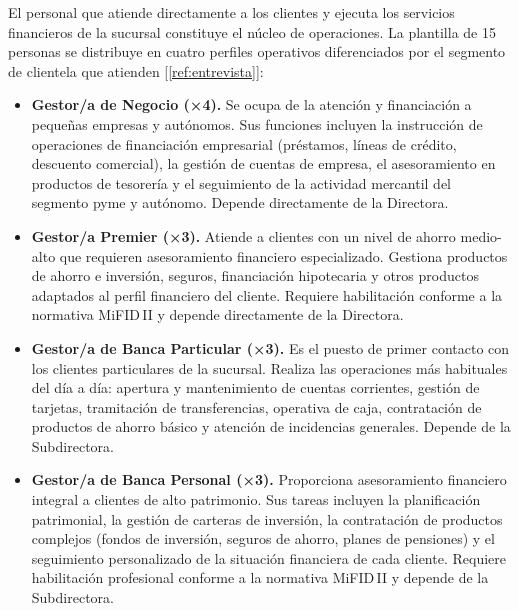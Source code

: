 El personal que atiende directamente a los clientes y ejecuta los servicios financieros
de la sucursal constituye el núcleo de operaciones. La plantilla de 15 personas se
distribuye en cuatro perfiles operativos diferenciados por el segmento de clientela que
atienden [\ref{ref:entrevista}]:

\begin{itemize}

  \item \textbf{Gestor/a de Negocio (×4).}
  Se ocupa de la atención y financiación a pequeñas empresas y autónomos. Sus funciones
  incluyen la instrucción de operaciones de financiación empresarial (préstamos, líneas de
  crédito, descuento comercial), la gestión de cuentas de empresa, el asesoramiento en
  productos de tesorería y el seguimiento de la actividad mercantil del segmento pyme y
  autónomo. Depende directamente de la Directora.

  \item \textbf{Gestor/a Premier (×3).}
  Atiende a clientes con un nivel de ahorro medio-alto que requieren asesoramiento
  financiero especializado. Gestiona productos de ahorro e inversión, seguros, financiación
  hipotecaria y otros productos adaptados al perfil financiero del cliente. Requiere
  habilitación conforme a la normativa MiFID\,II y depende directamente de la Directora.

  \item \textbf{Gestor/a de Banca Particular (×3).}
  Es el puesto de primer contacto con los clientes particulares de la sucursal. Realiza
  las operaciones más habituales del día a día: apertura y mantenimiento de cuentas
  corrientes, gestión de tarjetas, tramitación de transferencias, operativa de caja,
  contratación de productos de ahorro básico y atención de incidencias generales. Depende
  de la Subdirectora.

  \item \textbf{Gestor/a de Banca Personal (×3).}
  Proporciona asesoramiento financiero integral a clientes de alto patrimonio. Sus tareas
  incluyen la planificación patrimonial, la gestión de carteras de inversión, la
  contratación de productos complejos (fondos de inversión, seguros de ahorro, planes de
  pensiones) y el seguimiento personalizado de la situación financiera de cada cliente.
  Requiere habilitación profesional conforme a la normativa MiFID\,II y depende de la
  Subdirectora.

\end{itemize}

